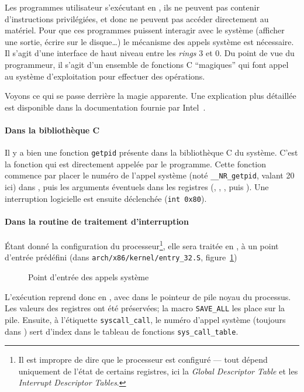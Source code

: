 \label{sec:impl-syscall}

Les programmes utilisateur s'exécutant en , ils ne peuvent pas contenir
d'instructions privilégiées, et donc ne peuvent pas accéder directement au
matériel. Pour que ces programmes puissent interagir avec le système (afficher
une sortie, écrire sur le disque…) le mécanisme des appels système est
nécessaire. Il s'agit d'une interface de haut niveau entre les \emph{rings} 3 et
0. Du point de vue du programmeur, il s'agit d'un ensemble de fonctions C
\enquote{magiques} qui font appel au système d'exploitation pour effectuer des
opérations.

Voyons ce qui se passe derrière la magie apparente. Une explication plus
détaillée est disponible dans la documentation fournie par
Intel~\cite{intelsys}.

\paragraph{Dans la bibliothèque C}

Il y a bien une fonction \texttt{getpid} présente dans la bibliothèque C du
système. C'est la fonction qui est directement appelée par le programme. Cette
fonction commence par placer le numéro de l'appel système (noté
\texttt{\_\_NR\_getpid}, valant 20 ici) dans \eax, puis les arguments éventuels
dans les registres (\ebx, \ecx, \edx, \esi{} puis \edi). Une interruption
logicielle est ensuite déclenchée (\verb!int 0x80!).

\paragraph{Dans la routine de traitement d'interruption}

Étant donné la configuration du processeur\footnote{Il est impropre de dire que
le processeur est configuré --- tout dépend uniquement de l'état de certains
registres, ici la \emph{Global Descriptor Table} et les \emph{Interrupt
Descriptor Tables}.}, elle sera traitée en , à un point d'entrée
prédéfini (dans \verb!arch/x86/kernel/entry_32.S!,
figure~\ref{fig:entry-syscall})

\begin{figure}[h]
    \caption{Point d'entrée des appels système}
    \label{fig:entry-syscall}
\end{figure}

L'exécution reprend donc en , avec dans \esp{} le pointeur de pile noyau
du processus. Les valeurs des registres ont été préservées; la macro
\texttt{SAVE\_ALL} les place sur la pile. Ensuite, à l'étiquette
\texttt{syscall\_call}, le numéro d'appel système (toujours dans \eax) sert
d'index dans le tableau de fonctions \texttt{sys\_call\_table}.


